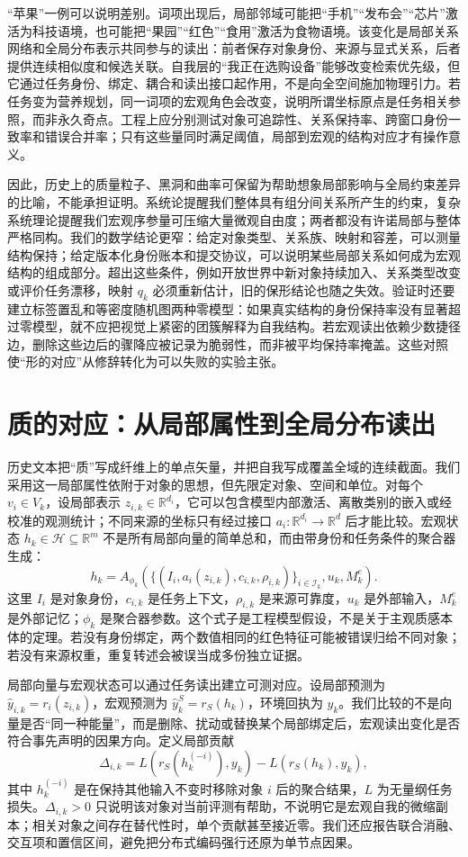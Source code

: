 “苹果”一例可以说明差别。词项出现后，局部邻域可能把“手机”“发布会”“芯片”激活为科技语境，也可能把“果园”“红色”“食用”激活为食物语境。该变化是局部关系网络和全局分布表示共同参与的读出：前者保存对象身份、来源与显式关系，后者提供连续相似度和候选关联。自我层的“我正在选购设备”能够改变检索优先级，但它通过任务身份、绑定、耦合和读出接口起作用，不是向全空间施加物理引力。若任务变为营养规划，同一词项的宏观角色会改变，说明所谓坐标原点是任务相关参照，而非永久奇点。工程上应分别测试对象可追踪性、关系保持率、跨窗口身份一致率和错误合并率；只有这些量同时满足阈值，局部到宏观的结构对应才有操作意义。

因此，历史上的质量粒子、黑洞和曲率可保留为帮助想象局部影响与全局约束差异的比喻，不能承担证明。系统论提醒我们整体具有组分间关系所产生的约束，复杂系统理论提醒我们宏观序参量可压缩大量微观自由度；两者都没有许诺局部与整体严格同构。我们的数学结论更窄：给定对象类型、关系族、映射和容差，可以测量结构保持；给定版本化身份账本和提交协议，可以说明某些局部关系如何成为宏观结构的组成部分。超出这些条件，例如开放世界中新对象持续加入、关系类型改变或评价任务漂移，映射 $q_k$ 必须重新估计，旧的保形结论也随之失效。验证时还要建立标签置乱和等密度随机图两种零模型：如果真实结构的身份保持率没有显著超过零模型，就不应把视觉上紧密的团簇解释为自我结构。若宏观读出依赖少数捷径边，删除这些边后的骤降应被记录为脆弱性，而非被平均保持率掩盖。这些对照使“形的对应”从修辞转化为可以失败的实验主张。

\section{质的对应：从局部属性到全局分布读出}
\label{sec:section_5075_1}
历史文本把“质”写成纤维上的单点矢量，并把自我写成覆盖全域的连续截面。我们采用这一局部属性依附于对象的思想，但先限定对象、空间和单位。对每个 $v_i\in V_k$，设局部表示 $z_{i,k}\in\mathbb{R}^{d_i}$，它可以包含模型内部激活、离散类别的嵌入或经校准的观测统计；不同来源的坐标只有经过接口 $a_i:\mathbb{R}^{d_i}\rightarrow\mathbb{R}^{d}$ 后才能比较。宏观状态 $h_k\in\mathcal{H}\subseteq\mathbb{R}^{m}$ 不是所有局部向量的简单总和，而由带身份和任务条件的聚合器生成：
\[
h_k=A_{\phi_k}\!\left(\{(I_i,a_i(z_{i,k}),c_{i,k},\rho_{i,k})\}_{i\in\mathcal{I}_k},u_k,M^e_k\right).
\]
这里 $I_i$ 是对象身份，$c_{i,k}$ 是任务上下文，$\rho_{i,k}$ 是来源可靠度，$u_k$ 是外部输入，$M^e_k$ 是外部记忆；$\phi_k$ 是聚合器参数。这个式子是工程模型假设，不是关于主观质感本体的定理。若没有身份绑定，两个数值相同的红色特征可能被错误归给不同对象；若没有来源权重，重复转述会被误当成多份独立证据。

局部向量与宏观状态可以通过任务读出建立可测对应。设局部预测为 $\hat y_{i,k}=r_i(z_{i,k})$，宏观预测为 $\hat y^S_k=r_S(h_k)$，环境回执为 $y_k$。我们比较的不是向量是否“同一种能量”，而是删除、扰动或替换某个局部绑定后，宏观读出变化是否符合事先声明的因果方向。定义局部贡献
\[
\Delta_{i,k}=L(r_S(h_k^{(-i)}),y_k)-L(r_S(h_k),y_k),
\]
其中 $h_k^{(-i)}$ 是在保持其他输入不变时移除对象 $i$ 后的聚合结果，$L$ 为无量纲任务损失。$\Delta_{i,k}>0$ 只说明该对象对当前评测有帮助，不说明它是宏观自我的微缩副本；相关对象之间存在替代性时，单个贡献甚至接近零。我们还应报告联合消融、交互项和置信区间，避免把分布式编码强行还原为单节点因果。

